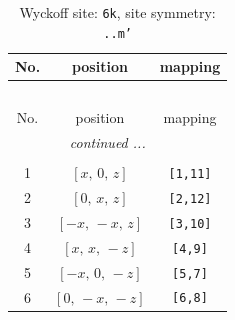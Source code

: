 \documentclass[fleqn,8pt]{jsarticle}
\begin{document}
\renewcommand{\arraystretch}{1.2}
\begin{longtable}{ccc}
\caption{Wyckoff site: {\tt 6k}, site symmetry: {\tt ..m'}}
 \\
 \hline \hline
No. & position & mapping \\ \hline \endfirsthead

\multicolumn{2}{l}{\tablename\ \thetable{}} \\
 \hline \hline
No. & position & mapping \\ \hline \endhead

 \hline \hline
\multicolumn{2}{r}{\footnotesize\it continued ...} \\ \endfoot

 \hline \hline
\multicolumn{2}{r}{} \\ \endlastfoot

1 & $\left[ x,\, 0,\, z \right]$ & {\tt [1,11]} \\ \hline
2 & $\left[ 0,\, x,\, z \right]$ & {\tt [2,12]} \\ \hline
3 & $\left[ - x,\, - x,\, z \right]$ & {\tt [3,10]} \\ \hline
4 & $\left[ x,\, x,\, - z \right]$ & {\tt [4,9]} \\ \hline
5 & $\left[ - x,\, 0,\, - z \right]$ & {\tt [5,7]} \\ \hline
6 & $\left[ 0,\, - x,\, - z \right]$ & {\tt [6,8]} \\
\end{longtable}
\renewcommand{\arraystretch}{1.2}
\end{document}
